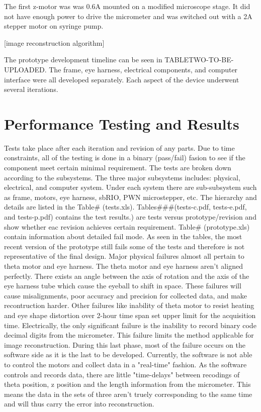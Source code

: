 \documentclass{article}
\begin{document}
The first z-motor was was 0.6A mounted on a modified microscope stage. It did not have enough power to drive the micrometer and was switched out with a 2A stepper motor on syringe pump.


 [image reconstruction algorithm]




The prototype development timeline can be seen in TABLETWO-TO-BE-UPLOADED. The frame, eye harness, electrical components, and computer interface were all developed separately. Each aspect of the device underwent several iterations.



\section{Performance Testing and Results}
\label{sec:perf-test-results}

Tests take place after each iteration and revision of any parts. Due to time constraints, all of the 
testing is done in a binary (pass/fail) fasion to see if the component meet certain minimal requirement. The 
tests are broken down according to the subsystems. The three major subsystems includes: physical, 
electrical, and computer system. Under each system there are sub-subsystem such as frame, motors, eye 
harness, sbRIO, PWN microstepper, etc.  The hierarchy and details are listed in the Table# (tests.xls). 
	Tables###(tests-c.pdf, tests-e.pdf, and tests-p.pdf) contains the test results.) are tests versus 
prototype/revision and show whether eac revision achieves certain requirement. Table# (prototype.xls)  
contain information about detailed fail mode. As seen in the tables, the most recent version of the prototype 
still fails some of the tests and therefore is not representative of the final design. Major physical failures 
almost all pertain to theta motor and eye harness. The theta motor and eye harness aren't aligned 
perfectly. There exists an angle between the axis of rotation and the axis of the eye harness tube which 
cause the eyeball to shift in space. These failures will cause misalignments, poor accuracy and precision 
for collected data, and make recontruction harder. Other failures like inability of theta motor to resist 
heating and eye shape distortion over 2-hour time span set upper limit for the acquisition time. Electrically, 
the only significant failure is the inability to record binary code decimal digits from the micrometer. This 
failure limits the method applicable for image reconstruction. 
	During this last phase, most of the failure occurs on the software side as it is the last to be 
developed. Currently, the software is not able to control the motors and collect data in a "real-time" fashion. 
As the software controls and records data, there are little "time-delays" between recodings of theta 
position, z position and the length information from the micrometer. This means the data in the sets of 
three aren't truely corresponding to the same time and will thus carry the error into reconstruction.
\end{document}
